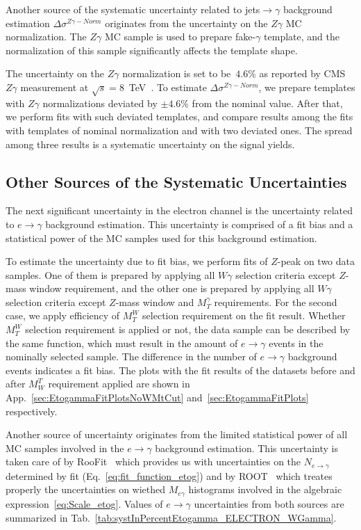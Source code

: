 Another source of the systematic uncertainty related to jets$\rightarrow\gamma$ background estimation $\Delta \sigma^{Z\gamma-Norm}$ originates from the  uncertainty on the $Z\gamma$ MC normalization. The $Z\gamma$ MC sample is used to prepare fake-$\gamma$ template, and the normalization of this sample significantly affects the template shape. 

The uncertainty on the $Z\gamma$ normalization is set to be~$4.6\%$ as reported by CMS $Z\gamma$ measurement at $\sqrt{s}=8$~TeV~\cite{ref_Zg8TeV}. To estimate $\Delta \sigma^{Z\gamma-Norm}$, we prepare templates with $Z\gamma$ normalizations deviated by $\pm 4.6\%$ from the nominal value. After that, we perform fits with such deviated templates, and compare results among the fits with templates of nominal normalization and with two deviated ones. The spread among three results is a systematic uncertainty on the signal yields. 

\subsection{Other Sources of the Systematic Uncertainties}
\label{sec:Systematics_OtherSources}

The next significant uncertainty in the electron channel is the uncertainty related to $e\rightarrow\gamma$ background estimation. This uncertainty is comprised of a fit bias and a statistical power of the MC samples used for this background estimation. 

To estimate the uncertainty due to fit bias, we perform fits of $Z$-peak on two data samples. One of them is prepared by applying all $W\gamma$ selection criteria except $Z$-mass window requirement, and the other one is prepared by applying all $W\gamma$ selection criteria except $Z$-mass window and $M_T^{\gamma}$ requirements. For the second case, we apply efficiency of $M_T^W$ selection requirement on the fit result. Whether $M_T^W$ selection requirement is applied or not, the data sample can be described by the same function, which must result in the amount of $e\rightarrow\gamma$ events in the nominally selected sample. The difference in the number of $e\rightarrow\gamma$ background events indicates a fit bias. The plots with the fit results of the datasets before and after $M_W^T$ requirement applied are shown in App.~\ref{sec:EtogammaFitPlotsNoWMtCut} and~\ref{sec:EtogammaFitPlots} respectively.

Another source of uncertainty originates from the limited statistical power of all MC samples involved in the $e\rightarrow\gamma$ background estimation. This uncertainty is taken care of by RooFit~\cite{ref_RooFit} which provides us with uncertainties on the $N_{e\rightarrow\gamma}$ determined by fit (Eq.~\ref{eq:fit_function_etog}) and by ROOT~\cite{ref_ROOT} which treates properly the uncertainties on wiethed $M_{e\gamma}$ histograms involved in the algebraic expression~\ref{eq:Scale_etog}. Values of $e\rightarrow\gamma$ uncertainties from both sources are summarized in Tab.~\ref{tab:systInPercentEtogamma_ELECTRON_WGamma}.


